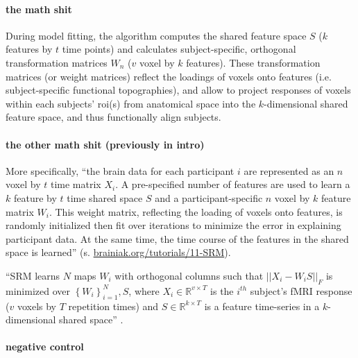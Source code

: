\paragraph{the math shit}

%
During model fitting, the algorithm computes the shared feature space $S$ ($k$
features by $t$ time points) and calculates subject-specific, orthogonal
transformation matrices $W_{n}$ ($v$ voxel by $k$ features).
%
These transformation matrices (or weight matrices) reflect the loadings of
voxels onto features (i.e. subject-specific functional topographies), and allow
to project responses of voxels within each subjects' \ac{roi}(s) from anatomical
space into the $k$-dimensional shared feature space, and thus functionally align
subjects.


\paragraph{the other math shit (previously in intro)}
%
More specifically, ``the brain data for each participant $i$ are represented as
an \textbf{$n$} voxel by $t$ time matrix  $X_{i}$. A pre-specified number of
features are used to learn a $k$ feature by  $t$ time shared space $S$ and a
participant-specific $n$ voxel by $k$  feature matrix $W_{i}$. This weight
matrix, reflecting the loading of voxels onto features, is randomly initialized
then fit over iterations to minimize the error in explaining participant data.
At the same time, the time course of the features in the shared space is
learned'' (s.
\href{https://brainiak.org/tutorials/11-SRM/}{brainiak.org/tutorials/11-SRM}).

%
``SRM learns $N$ maps $W_{i}$ with orthogonal columns such that
$||X_{i}-W_{i}S||_{F}$ is minimized over $\left\{ W_{i}\right\} _{i=1}^{N},S$,
where $X_{i}\in\mathbb{R}^{v\times{T}}$ is the $i^{th}$ subject's fMRI response
($v$ voxels by $T$ repetition times) and $S\in\mathbb{R}^{k\times{T}}$ is a
feature time-series in a $k$-dimensional shared space''
\citep{vodrahalli2018mapping}.


\paragraph{negative control}



